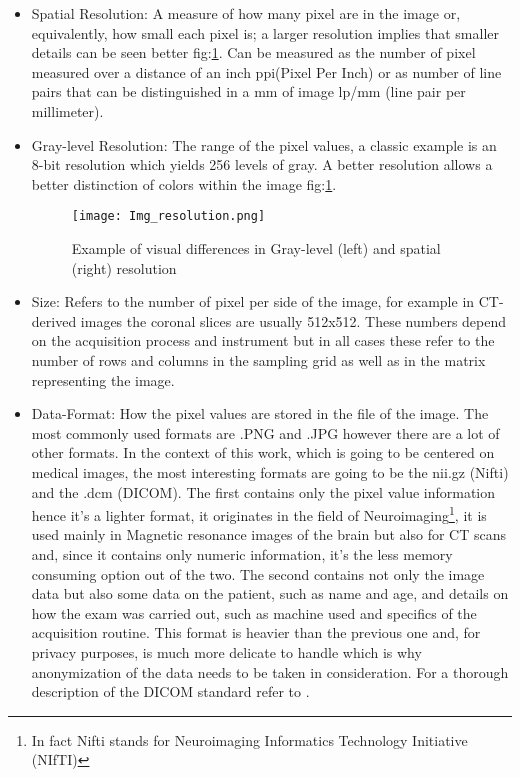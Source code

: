 \begin{itemize}
\item Spatial Resolution: A measure of how many pixel are in the image or, equivalently, how small each pixel is; a larger resolution implies that smaller details can be seen better fig:\ref{fig:resolution_types}. Can be measured as the number of pixel measured over a distance of an inch ppi(Pixel Per Inch) or as number of line pairs that can be distinguished in a mm of image lp/mm (line pair per millimeter).
\item Gray-level Resolution: The range of the pixel values, a classic example is an 8-bit resolution which yields 256 levels of gray. A better resolution allows a better distinction of colors within the image fig:\ref{fig:resolution_types}.

\begin{figure}[H]
  		\texttt{[image: Img\_resolution.png]}
        \caption{Example of visual differences in Gray-level (left) and spatial (right) resolution \label{fig:resolution_types}}
\end{figure}

\item Size: Refers to the number of pixel per side of the image, for example in CT-derived images the coronal slices are usually 512x512. These numbers depend on the acquisition process and instrument but in all cases these refer to the number of rows and columns in the sampling grid as well as in the matrix representing the image.
\item Data-Format: How the pixel values are stored in the file of the image. The most commonly used formats are .PNG and .JPG however there are a lot of other formats. In the context of this work, which is going to be centered on medical images, the most interesting formats are going to be the nii.gz (Nifti) and the .dcm (DICOM). The first contains only the pixel value information hence it's a lighter format, it originates in the field of Neuroimaging\footnote{In fact Nifti stands for Neuroimaging Informatics Technology Initiative (NIfTI)}, it is used mainly in Magnetic resonance images of the brain but also for CT scans and, since it contains only  numeric information, it's the less memory consuming option out of the two. The second contains not only the image data but also some data on the patient, such as name and age, and details on how the exam was carried out, such as machine used and specifics of the acquisition routine. This format is heavier than the previous one and, for privacy purposes, is much more delicate to handle which is why anonymization of the data needs to be taken in consideration. For a thorough description of the DICOM standard refer to \cite{DICOM}. 
\end{itemize}

